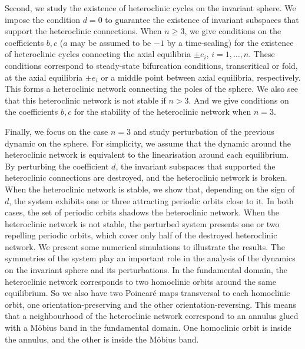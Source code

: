 \documentclass{article}
\theoremstyle{definition}
\begin{document}
Second, we study the existence of heteroclinic cycles on the invariant sphere.
We impose the condition $d=0$ to guarantee the existence of invariant subspaces that support the heteroclinic connections.
When $n \geq 3$, we give conditions on the coefficients $b,c$ ($a$ may be assumed to be $-1$ by a time-scaling) for the existence of heteroclinic cycles connecting the axial equilibria $\pm e_i$, $i=1,\dots,n$.
These conditions correspond to steady-state bifurcation conditions, transcritical or fold, at the axial equilibria $\pm e_i$ or a middle point between axial equilibria, respectively.
This forms a heteroclinic network connecting the poles of the sphere.
We also see that this heteroclinic network is not stable if $n>3$. And we give conditions on the coefficients $b,c$ for the stability of the heteroclinic network when $n=3$.

Finally, we focus on the case $n=3$ and study perturbation of the previous dynamic on the sphere.
For simplicity, we assume that the dynamic around the heteroclinic network is equivalent to the linearisation around each equilibrium.
By perturbing the coefficient $d$, the invariant subspaces that supported the heteroclinic connections are destroyed, and the heteroclinic network is broken.
When the heteroclinic network is stable, we show that, depending on the sign of $d$, the system exhibits one or three attracting periodic orbits close to it.
In both cases, the set of periodic orbits shadows the heteroclinic network.
When the heteroclinic network is not stable, the perturbed system presents one or two repelling periodic orbits, which cover only half of the destroyed heteroclinic network.
We present some numerical simulations to illustrate the results.
The symmetries of the system play an important role in the analysis of the dynamics on the invariant sphere and its perturbations.
In the fundamental domain, the heteroclinic network corresponds to two homoclinic orbits around the same equilibrium.
So we also have two Poincaré maps transversal to each homoclinic orbit, one orientation-preserving and the other orientation-reversing.
This means that a neighbourhood of the heteroclinic network correspond to an annulus glued with a Möbius band in the fundamental domain.
One homoclinic orbit is inside the annulus, and the other is inside the Möbius band.
\end{document}
